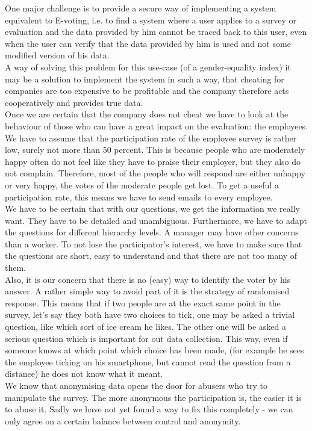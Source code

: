 \documentclass[portrait,a4paper]{article}
\begin{document}
		One major challenge is to provide a secure way of implementing a system equivalent to E-voting, 
		i.e. to find a system where a user applies to a survey or evaluation and the data provided by 
		him cannot be traced back to this user, even when the user can verify that the data provided 
		by him is used and not some modified version of his data.\\
		A way of solving this problem for this use-case (of a gender-equality index) it may be a 
		solution to implement the system in such a way, that cheating for companies are too expensive 
		to be profitable and the company therefore acts cooperatively and provides true data.\\
		Once we are certain that the company does not cheat we have to look at the behaviour 
		of those who can have a great impact on the evaluation: the employees.\\
		
		We have to assume that the participation rate of the employee survey is rather low, 
		surely not more than 50 percent. This is because people who are moderately happy often 
		do not feel like they have to praise their employer, but they also do not complain. 
		Therefore, most of the people who will respond are either unhappy or very happy, 
		the votes of the moderate people get lost. To get a useful a participation rate, 
		this means we have to send emails to every employee.\\
		We have to be certain that with our questions, we get the information we really want. 
		They have to be detailed and unambiguous. Furthermore, we have to adapt the questions for 
		different hierarchy levels. A manager may have other concerns than a worker.
		To not lose the participator's interest, we have to make sure that the questions are short, 
		easy to understand and that there are not too many of them.\\
		
		Also, it is our concern that there is no (easy) way to identify the voter by his answer. 
		A rather simple way to avoid part of it is the strategy of randomised response. 
		This means that if two people are at the exact same point in the survey, let's say they both 
		have two choices to tick, one may be asked a trivial question, like which sort of ice cream he likes. 
		The other one will be asked a serious question which is important for out data collection. 
		This way, even if someone knows at which point which choice has been made, (for example he sees 
		the employee ticking on his smartphone, but cannot read the question from a distance) 
		he does not know what it meant.\\
		We know that anonymising data opens the door for abusers who try to manipulate the survey. 
		The more anonymous the participation is, the easier it is to abuse it. Sadly we have not yet found a 
		way to fix this completely - we can only agree on a certain balance between control and anonymity.\\
		
\end{document}
